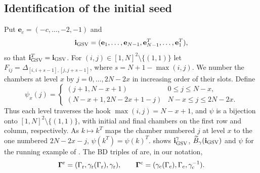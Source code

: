 \documentclass[a4paper]{amsart}
\numberwithin{equation}{section}
\theoremstyle{definition}
\theoremstyle{remark}
\newcommand{\bfi}{\mathbf{i}}
\newcommand{\tB}{\widetilde{B}}
\newcommand{\rr}{{\rm r}}
\newcommand{\cc}{{\rm c}}
\begin{document}
\subsection{Identification of the initial seed}
\label{sec: base case concise}
Put $\mathbf e_c=(-c,\dots,-2,-1)$ and
\[
  \bfi_{\rm GSV}=(\mathbf e_1,\dots,\mathbf e_{N-1},\mathbf e_{N-1}^T,\dots,\mathbf e_1^T),
\]
so that $\bfi_{\rm GSV}^T=\bfi_{\rm GSV}$.
For $(i,j)\in[1,N]^2\setminus\{(1,1)\}$ let $F_{ij}=\Delta_{[i,i+s-1],[j,j+s-1]}$, where $s=N+1-\max(i,j)$.
We number the chambers at level $x$ by $j=0,\dots,2N-2x$ in increasing order of their slots.
Define
\begin{equation}
  \label{eq: psi concise}
  \psi_x(j)=
  \begin{cases}
    (j+1,N-x+1)&0\le j\le N-x,\\
    (N-x+1,2N-2x+1-j)&N-x\le j\le2N-2x.
  \end{cases}
\end{equation}
Thus each level traverses the hook $\max(i,j)=N-x+1$, and $\psi$ is a bijection onto $[1,N]^2\setminus\{(1,1)\}$, with initial and final chambers on the first row and column, respectively.
As $k\mapsto k^T$ maps the chamber numbered $j$ at level $x$ to the one numbered $2N-2x-j$, $\psi(k^T)=\psi(k)^T$.
 shows $\bfi_{\rm GSV}^\gamma$, $\tB_\gamma(\bfi_{\rm GSV})$ and $\psi$ for the running example of \cite{GSV23}.
The BD triples of \cite{GSV23} are, in our notation,
\[
  \mathbf\Gamma^\rr=(\Gamma_{\rr},\gamma_{\rr}(\Gamma_{\rr}),\gamma_{\rr}),\qquad
  \mathbf\Gamma^\cc=(\gamma_{\cc}(\Gamma_{\cc}),\Gamma_{\cc},\gamma_{\cc}^{-1}).
\]
\end{document}
